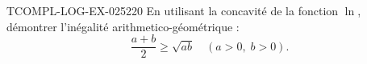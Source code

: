 \begin{exercice}{TCOMPL-LOG-EX-025}{2}{20}
En utilisant la concavité de la fonction $\ln$, démontrer l'inégalité arithmetico-géométrique :
\[ \frac{a+b}{2} \geq \sqrt{ab} \quad (a > 0,\; b > 0). \]

\end{exercice}
